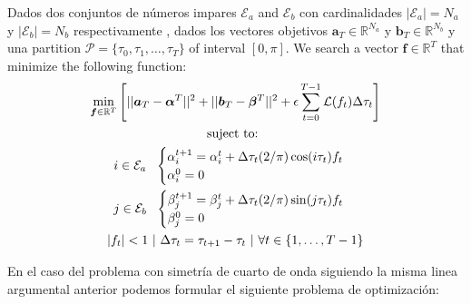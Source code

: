 \begin{problem}
    Dados dos conjuntos de números impares $\mathcal{E}_a$ and $\mathcal{E}_b$ con cardinalidades $|\mathcal{E}_a| = N_a$ y  $|\mathcal{E}_b| = N_b$ respectivamente , dados los vectores objetivos $\bm{a}_T  \in \mathbb{R}^{N_a}$ y $\bm{b}_T  \in \mathbb{R}^{N_b}$ y una  partition $\mathcal{P} = \{\tau_0,\tau_1,\dots,\tau_{T}\}$ of interval $[0,\pi]$. We search a vector $\bm{f} \in \mathbb{R}^{T}$ that minimize the following function:
    \begin{gather}
        \min_{\bm{f} \in \mathbb{R}^{T} } 
        \Bigg[ 
        || \bm{a}_T - \bm{\alpha}^{T}||^2 + 
        || \bm{b}_T - \bm{\beta}^{T}||^2 
        + \epsilon  \sum_{t=0}^{T-1} \mathcal{L}(f_{t}) \Delta\tau_t  \Bigg]  \\
        \notag \text{suject to: } \\
        \notag i \in \mathcal{E}_a \ \ 
        \begin{cases}
            \alpha_i^{t+1} = \alpha_i^{t} + \Delta \tau_t (2/\pi) \cos(i\tau_t) f_t \\
            \alpha_i^0 = 0
        \end{cases} \\
        \notag j \in \mathcal{E}_b \ \ 
        \begin{cases}
            \beta_j^{t+1} = \beta_j^{t} + \Delta \tau_t (2/\pi) \sin(j\tau_t) f_t \\
            \beta_j^0 = 0
        \end{cases} \\
        \notag |f_t| < 1 \ | \  \Delta \tau_t = \tau_{t+1} - \tau_{t} \ | \ \forall t \in \{1,\dots,T-1\}
    \end{gather}
\end{problem}


En el caso del problema con simetría de cuarto de onda siguiendo la misma linea argumental anterior podemos formular el siguiente problema de optimización:

